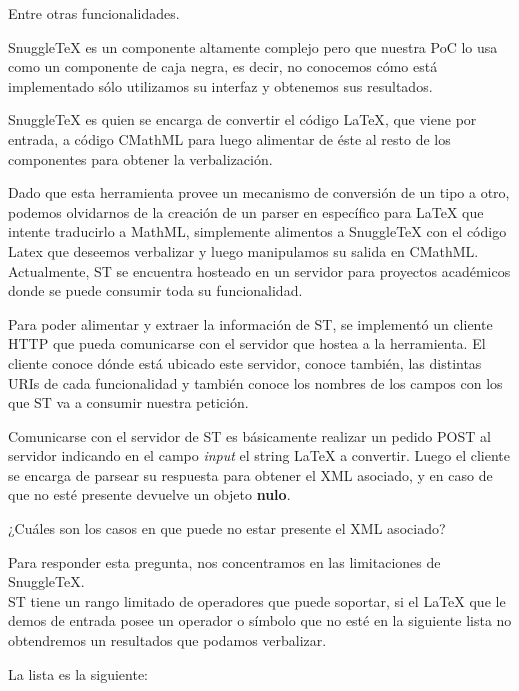 Entre otras funcionalidades.

SnuggleTeX es un componente altamente complejo pero que nuestra PoC lo usa como un componente de caja negra, es decir, no conocemos cómo está implementado sólo utilizamos su interfaz y obtenemos sus resultados.

SnuggleTeX es quien se encarga de convertir el código LaTeX\cite{4}, que viene por entrada, a código CMathML para luego alimentar de éste al resto de los componentes para obtener la verbalización.

Dado que esta herramienta provee un mecanismo de conversión de un tipo a otro, podemos olvidarnos de la creación de un parser en específico para LaTeX que intente traducirlo a MathML, simplemente alimentos a SnuggleTeX con el código Latex que deseemos verbalizar y luego manipulamos su salida en CMathML. Actualmente, ST se encuentra hosteado en un servidor para proyectos académicos donde se puede consumir toda su funcionalidad.

Para poder alimentar y extraer la información de ST, se implementó un cliente HTTP que pueda comunicarse con el servidor que hostea a la herramienta. El cliente conoce dónde está ubicado este servidor, conoce también, las distintas URIs de cada funcionalidad y también conoce los nombres de los campos con los que ST va a consumir nuestra petición.

Comunicarse con el servidor de ST es básicamente realizar un pedido POST al servidor indicando en el campo \textit{input} el string LaTeX a convertir. Luego el cliente se encarga de parsear su respuesta para obtener el XML asociado, y en caso de que no esté presente devuelve un objeto \textbf{nulo}.

¿Cuáles son los casos en que puede no estar presente el XML asociado?

Para responder esta pregunta, nos concentramos en las limitaciones de SnuggleTeX. \\
ST tiene un rango limitado de operadores que puede soportar, si el LaTeX que le demos de entrada posee un operador o símbolo que no esté en la siguiente lista no obtendremos un resultados que podamos verbalizar.

La lista es la siguiente:

